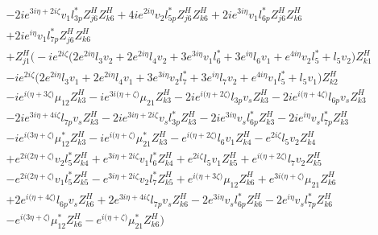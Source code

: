 \begin{align}
 &-2 i e^{3 i \eta +2 i \zeta } v_1 l_{3p}^* Z_{{j 6}}^{H} Z_{{k 6}}^{H} +4 i e^{2 i \eta } v_2 l_{5p}^* Z_{{j 6}}^{H} Z_{{k 6}}^{H} +2 i e^{3 i \eta } v_1 l_{6p}^* Z_{{j 6}}^{H} Z_{{k 6}}^{H} \nonumber \\ 
 &+2 i e^{i \eta } v_1 l_{7p}^* Z_{{j 6}}^{H} Z_{{k 6}}^{H} \nonumber \\ 
 &+Z_{{j 1}}^{H} \Big(-i e^{2 i \zeta } \Big(2 e^{2 i \eta } l_3 v_2  + 2 e^{2 i \eta } l_4 v_2  + 3 e^{3 i \eta } v_1 l_6^*  + 3 e^{i \eta } l_6 v_1  + e^{4 i \eta } v_2 l_5^*  + l_5 v_2 \Big)Z_{{k 1}}^{H} \nonumber \\ 
 &-i e^{2 i \zeta } \Big(2 e^{2 i \eta } l_3 v_1  + 2 e^{2 i \eta } l_4 v_1  + 3 e^{3 i \eta } v_2 l_7^*  + 3 e^{i \eta } l_7 v_2  + e^{4 i \eta } v_1 l_5^*  + l_5 v_1 \Big)Z_{{k 2}}^{H} \nonumber \\ 
 &-i e^{i \Big(\eta +3 \zeta \Big)} \mu_{12} Z_{{k 3}}^{H} -i e^{3 i \Big(\eta +\zeta \Big)} \mu_{21} Z_{{k 3}}^{H} -2 i e^{i \Big(\eta +2 \zeta \Big)} l_{3p} v_s Z_{{k 3}}^{H} -2 i e^{i \Big(\eta +4 \zeta \Big)} l_{6p} v_s Z_{{k 3}}^{H} \nonumber \\ 
 &-2 i e^{3 i \eta +4 i \zeta } l_{7p} v_s Z_{{k 3}}^{H} -2 i e^{3 i \eta +2 i \zeta } v_s l_{3p}^* Z_{{k 3}}^{H} -2 i e^{3 i \eta } v_s l_{6p}^* Z_{{k 3}}^{H} -2 i e^{i \eta } v_s l_{7p}^* Z_{{k 3}}^{H} \nonumber \\ 
 &-i e^{i \Big(3 \eta +\zeta \Big)} \mu_{12}^* Z_{{k 3}}^{H} -i e^{i \Big(\eta +\zeta \Big)} \mu_{21}^* Z_{{k 3}}^{H} - e^{i \Big(\eta +2 \zeta \Big)} l_6 v_1 Z_{{k 4}}^{H} - e^{2 i \zeta } l_5 v_2 Z_{{k 4}}^{H} \nonumber \\ 
 &+e^{2 i \Big(2 \eta +\zeta \Big)} v_2 l_5^* Z_{{k 4}}^{H} +e^{3 i \eta +2 i \zeta } v_1 l_6^* Z_{{k 4}}^{H} +e^{2 i \zeta } l_5 v_1 Z_{{k 5}}^{H} +e^{i \Big(\eta +2 \zeta \Big)} l_7 v_2 Z_{{k 5}}^{H} \nonumber \\ 
 &- e^{2 i \Big(2 \eta +\zeta \Big)} v_1 l_5^* Z_{{k 5}}^{H} - e^{3 i \eta +2 i \zeta } v_2 l_7^* Z_{{k 5}}^{H} +e^{i \Big(\eta +3 \zeta \Big)} \mu_{12} Z_{{k 6}}^{H} +e^{3 i \Big(\eta +\zeta \Big)} \mu_{21} Z_{{k 6}}^{H} \nonumber \\ 
 &+2 e^{i \Big(\eta +4 \zeta \Big)} l_{6p} v_s Z_{{k 6}}^{H} +2 e^{3 i \eta +4 i \zeta } l_{7p} v_s Z_{{k 6}}^{H} -2 e^{3 i \eta } v_s l_{6p}^* Z_{{k 6}}^{H} -2 e^{i \eta } v_s l_{7p}^* Z_{{k 6}}^{H} \nonumber \\ 
 &- e^{i \Big(3 \eta +\zeta \Big)} \mu_{12}^* Z_{{k 6}}^{H} - e^{i \Big(\eta +\zeta \Big)} \mu_{21}^* Z_{{k 6}}^{H} \Big)\nonumber \\ 

\end{align}
